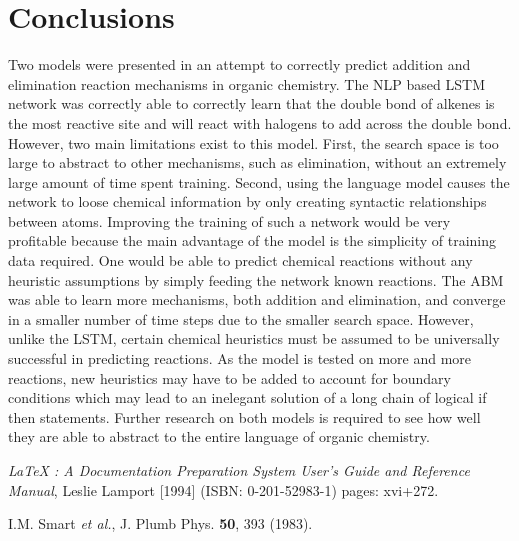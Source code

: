 \documentclass[aps,floatfix,prd,showpacs]{revtex4}
\begin{document}
\section{Conclusions}
Two models were presented in an attempt to correctly predict addition and elimination reaction mechanisms in organic chemistry. The NLP based LSTM network was correctly able to correctly learn that the double bond of alkenes is the most reactive site and will react with halogens to add across the double bond. However, two main limitations exist to this model. First, the search space is too large to abstract to other mechanisms, such as elimination, without an extremely large amount of time spent training. Second, using the language model causes the network to loose chemical information by only creating syntactic relationships between atoms. Improving the training of such a network would be very profitable because the main advantage of the model is the simplicity of training data required. One would be able to predict chemical reactions without any heuristic assumptions by simply feeding the network known reactions. 
The ABM was able to learn more mechanisms, both addition and elimination, and converge in a smaller number of time steps due to the smaller search space. However, unlike the LSTM, certain chemical heuristics must be assumed to be universally successful in predicting reactions. As the model is tested on more and more reactions, new heuristics may have to be added to account for boundary conditions which may lead to an inelegant solution of a long chain of logical if then statements. Further research on both models is required to see how well they are able to abstract to the entire language of organic chemistry.




\begin{thebibliography}{99}

 {\sl LaTeX : A Documentation Preparation System User's Guide and Reference Manual}, Leslie Lamport [1994] (ISBN: 0-201-52983-1) pages: xvi+272.

I.M. Smart {\it et al.}, J. Plumb Phys. {\bf 50}, 393 (1983).

\end{thebibliography}
\end{document}
